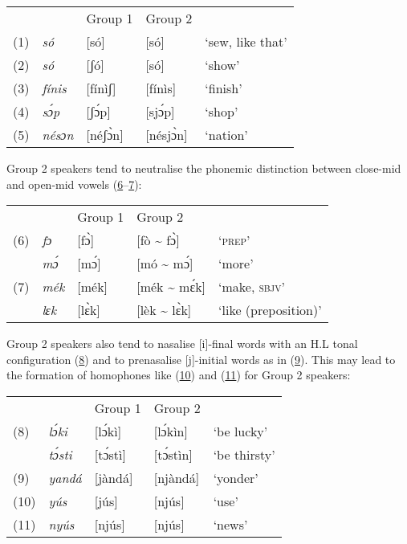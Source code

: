 

\bigskip
\noindent\begin{tabularx}{\textwidth}{l ll lX}
 &  & Group 1 &  Group 2 & \\
(1) \label{ex:0.1}
         & \itshape só & [só] & [só]  & ‘sew, like that’\\
(2) \label{ex:0.1.1}
         & \itshape só & [ʃó] & [só]  & ‘show’\\
(3) \label{ex:0.2}
         & \itshape fínis & [fínìʃ] & [fínìs] & ‘finish’\\
(4) \label{ex:0.3}
         & \itshape sɔ́p & [ʃɔ́p] & [sjɔ́p] & ‘shop’\\
(5) \label{ex:0.4}
         & \itshape nésɔn & [néʃɔ̀n] & [nésjɔ̀n] & ‘nation’\\
\end{tabularx}

\bigskip
Group 2 speakers tend to neutralise the phonemic distinction between close-mid and open-mid vowels (\hyperref[ex:0.5]{6}–\hyperref[ex:0.6]{7}):

\bigskip
\noindent\begin{tabularx}{\textwidth}{l ll lX}
 &  & Group 1 & Group 2 & \\
(6) \label{ex:0.5}
         & \itshape fɔ & [fɔ̀] & [fò {\textasciitilde} fɔ̀] & ‘\textsc{prep}’\\
& \itshape mɔ́ & [mɔ́] & [mó {\textasciitilde} mɔ́] & ‘more’\\
(7) \label{ex:0.6}
         & \itshape mék & [mék] & [mék {\textasciitilde} mɛ́k] & ‘make, \textsc{sbjv}’\\
& \itshape lɛk & [lɛ̀k] & [lèk {\textasciitilde} lɛ̀k] & ‘like (preposition)’\\
\end{tabularx}

\bigskip
Group 2 speakers also tend to nasalise [i]-final words with an H.L tonal configuration (\hyperref[ex:0.7]{8}) and to prenasalise [j]-initial words as in (\hyperref[ex:0.8]{9}). This may lead to the formation of homophones like (\hyperref[ex:0.9]{10}) and (\hyperref[ex:0.10]{11}) for Group 2 speakers:

\bigskip
\noindent\begin{tabularx}{\textwidth}{l ll lX}
 &  & Group 1 & Group 2 & \\
(8) \label{ex:0.7}
         & \itshape lɔ́ki & [lɔ́kì] & [lɔ́kìn] & ‘be lucky’\\
& \itshape tɔ́sti & [tɔ́stì] & [tɔ́stìn] & ‘be thirsty’\\
(9) \label{ex:0.8}
         & \itshape yandá & [jàndá] & [njàndá] & ‘yonder’\\
(10) \label{ex:0.9}
         & \itshape yús & [jús] & [njús] & ‘use’\\
(11) \label{ex:0.10}
         & \itshape nyús & [njús] & [njús] & ‘news’\\
\end{tabularx}



